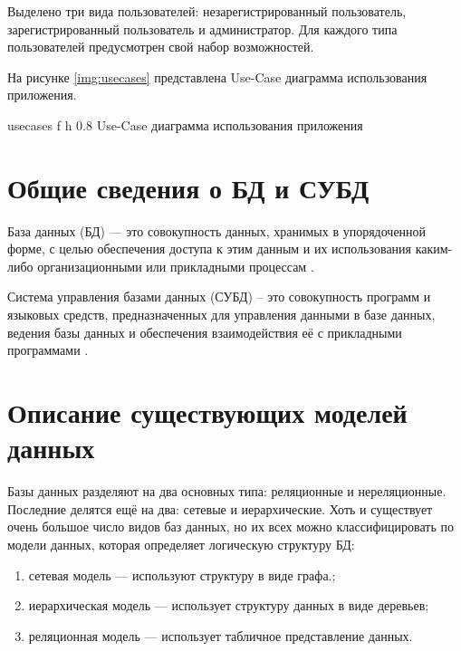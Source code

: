 Выделено три вида пользователей: незарегистрированный пользователь, зарегистрированный пользователь и администратор. Для каждого типа пользователей предусмотрен
свой набор возможностей. 

 На рисунке \ref{img:usecases} представлена Use-Case диаграмма использования приложения.

    {usecases} %
    {f} %
    {h} %
    {0.8\textwidth} %
    {Use-Case диаграмма использования приложения} %
\newpage    


\section{Общие сведения о БД и СУБД}
База данных (БД) — это совокупность данных, хранимых в упорядоченной форме, с целью обеспечения доступа к этим данным и их использования
каким-либо организационными или прикладными процессам \cite{bd}.

Система управления базами данных (СУБД) – это совокупность программ
и языковых средств, предназначенных для управления данными в базе данных,
ведения базы данных и обеспечения взаимодействия её с прикладными программами \cite{subd}.

\section{Описание существующих моделей данных}
Базы данных разделяют на два основных типа: реляционные и нереляционные. Последние делятся ещё на два: сетевые и иерархические. Хоть и существует очень большое число видов баз данных, но их всех можно классифицировать по модели данных, которая определяет логическую
структуру БД:
\begin{enumerate}
    \item сетевая модель --- используют структуру в виде графа.;
    \item иерархическая модель ---  использует структуру данных в виде деревьев;
    \item реляционная модель --- использует табличное представление данных.
\end{enumerate}


